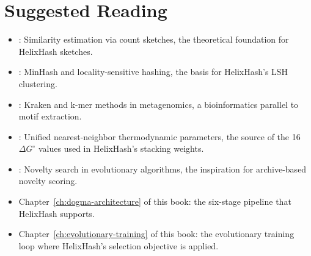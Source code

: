 \section*{Suggested Reading}
\begin{itemize}[leftmargin=1.5em]
  \item \citet{charikar2002}: Similarity estimation via count sketches, the theoretical foundation for HelixHash sketches.
  \item \citet{broder1997}: MinHash and locality-sensitive hashing, the basis for HelixHash's LSH clustering.
  \item \citet{wood2014}: Kraken and k-mer methods in metagenomics, a bioinformatics parallel to motif extraction.
  \item \citet{santalucia1998}: Unified nearest-neighbor thermodynamic parameters, the source of the 16 $\Delta G^{\circ}$ values used in HelixHash's stacking weights.
  \item \citet{lehman2011}: Novelty search in evolutionary algorithms, the inspiration for archive-based novelty scoring.
  \item Chapter~\ref{ch:dogma-architecture} of this book: the six-stage pipeline that HelixHash supports.
  \item Chapter~\ref{ch:evolutionary-training} of this book: the evolutionary training loop where HelixHash's selection objective is applied.
\end{itemize}
